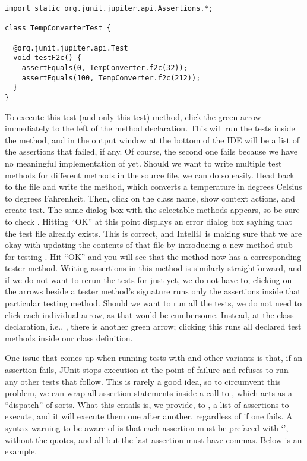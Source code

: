 \begin{lstlisting}[language=MyJava]
import static org.junit.jupiter.api.Assertions.*;

class TempConverterTest {

  @org.junit.jupiter.api.Test
  void testF2c() {
    assertEquals(0, TempConverter.f2c(32));
    assertEquals(100, TempConverter.f2c(212));
  }
}
\end{lstlisting}

To execute this test (and only this test) method, click the green arrow immediately to the left of the method declaration. This will run the tests inside the method, and in the output window at the bottom of the IDE will be a list of the assertions that failed, if any. Of course, the second one fails because we have no meaningful implementation of  yet. Should we want to write multiple test methods for different methods in the source file, we can do so easily. Head back to the  file and write the  method, which converts a temperature in degrees Celsius to degrees Fahrenheit. Then, click on the class name, show context actions, and create test. The same dialog box with the selectable methods appears, so be sure to check . Hitting ``OK'' at this point displays an error dialog box sayhing that the test file already exists. This is correct, and IntelliJ is making sure that we are okay with updating the contents of that file by introducing a new method stub for testing . Hit ``OK'' and you will see that the  method now has a corresponding tester method. Writing assertions in this method is similarly straightforward, and if we do not want to rerun the tests for  just yet, we do not have to; clicking on the arrows beside a tester method's signature runs only the assertions inside that particular testing method. Should we want to run all the tests, we do not need to click each individual arrow, as that would be cumbersome. Instead, at the class declaration, i.e., , there is another green arrow; clicking this runs all declared test methods inside our class definition.

One issue that comes up when running tests with  and other variants is that, if an assertion fails, JUnit stops execution at the point of failure and refuses to run any other tests that follow. This is rarely a good idea, so to circumvent this problem, we can wrap all assertion statements inside a call to , which acts as a ``dispatch'' of sorts. What this entails is, we provide, to , a list of assertions to execute, and it will execute them one after another, regardless of if one fails. A syntax warning to be aware of is that each assertion must be prefaced with `\ttt{() -> }', without the quotes, and all but the last assertion must have commas. Below is an example.

